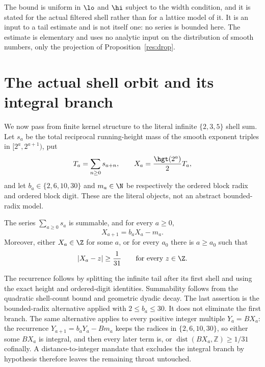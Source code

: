 The bound is uniform in $\lo$ and $\hi$ subject to the width condition, and it
is stated for the actual filtered shell rather than for a lattice model of it.
It is an input to a tail estimate and is not itself one: no series is bounded
here.  The estimate is elementary and uses no analytic input on the
distribution of smooth numbers, only the projection of
Proposition~\ref{res:drop}.


\section{The actual shell orbit and its integral branch}\label{sec:actual-orbit}

We now pass from finite kernel structure to the literal infinite
$\{2,3,5\}$ shell sum.  Let $s_a$ be the total reciprocal running-height mass
of the smooth exponent triples in $[2^a,2^{a+1})$, put
\[
 T_a=\sum_{n\ge0}s_{a+n},\qquad
 X_a=\frac{\hgt(2^a)}2T_a,
\]
and let $b_a\in\{2,6,10,30\}$ and $m_a\in\N$ be respectively the ordered
block radix and ordered block digit.  These are the literal objects, not an
abstract bounded-radix model.

\begin{theorem}\label{res:actual-orbit}
The series $\sum_{a\ge0}s_a$ is summable, and for every $a\ge0$,
\[
 X_{a+1}=b_aX_a-m_a.
\]
Moreover, either $X_a\in\Z$ for some $a$, or for every $a_0$ there is
$a\ge a_0$ such that
\[
 |X_a-z|\ge\frac1{31}\qquad\hbox{for every }z\in\Z.
\]
\end{theorem}

The recurrence follows by splitting the infinite tail after its first shell
and using the exact height and ordered-digit identities.  Summability follows
from the quadratic shell-count bound and geometric dyadic decay.  The last
assertion is the bounded-radix alternative applied with $2\le b_a\le30$.
It does not eliminate the first branch.  The same alternative applies to
every positive integer multiple $Y_a=BX_a$: the recurrence
$Y_{a+1}=b_aY_a-Bm_a$ keeps the radices in $\{2,6,10,30\}$, so either some
$BX_a$ is integral, and then every later term is, or
$\operatorname{dist}(BX_a,\mathbb Z)\ge 1/31$ cofinally.  A
distance-to-integer mandate that excludes the integral branch by hypothesis
therefore leaves the remaining throat untouched.

